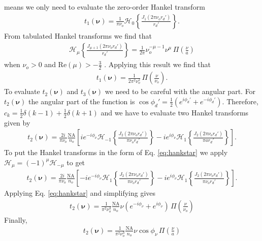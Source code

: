 \documentclass[11pt]{article}
\providecommand{\bs}[1]{\boldsymbol{#1}}
\begin{document}
means we only need to evaluate the zero-order Hankel transform
\begin{align}
  t_1(\bs{\nu}) = \frac{1}{\pi \nu_o}\mathcal{H}_0\left\{\frac{J_1(2\pi \nu_or_d')}{r_d'}\right\}.
\end{align}
From tabulated Hankel transforms we find that
\begin{align}
  \mathcal{H}_{\mu}\left\{\frac{J_{\mu+1}(2\pi \nu_or_d')}{r_d'}\right\} =
  \frac{1}{2\pi}\nu_o^{-\mu-1}\nu^\mu\, \Pi\left(\frac{\nu}{a}\right)\label{eq:hankstar}
\end{align}
when $\nu_o > 0$ and $\text{Re}(\mu) > -\frac{3}{2}$ \cite{poul1998}. Applying this result
we find that
\begin{align}
  t_1(\bs{\nu}) =
    \frac{1}{2\pi^2 \nu_o^{2}}\, \Pi\left(\frac{\nu}{\nu_o}\right)\label{eq:t1final}.
\end{align}
To evaluate $t_2(\bs{\nu})$ and $t_3(\bs{\nu})$ we need to be careful with the angular part. For $t_2(\bs{\nu})$
the angular part of the function is $\cos\phi_d' = \frac{1}{2}\left(e^{i\phi_d'} + e^{-i\phi_d'}\right)$. Therefore, $c_k = \frac{1}{2}\delta(k-1) + \frac{1}{2}\delta(k+1)$ and we have to evaluate two Hankel transforms given by
\begin{align}
  t_2(\bs{\nu}) = \frac{2i}{\pi \nu_o}\frac{\text{NA}}{n_o}\left[ie^{-i\phi_{\nu}}\mathcal{H}_{-1}\left\{\frac{J_2(2\pi \nu_or_d')}{\pi \nu_or_d'}\right\} - ie^{i\phi_{\nu}}\mathcal{H}_{1}\left\{\frac{J_2(2\pi \nu_or_d')}{\pi ar_d'}\right\}\right].
\end{align}
To put the Hankel transforms in the form of Eq. \ref{eq:hankstar} we apply
$\mathcal{H}_\mu = (-1)^\mu\mathcal{H}_{-\mu}$ to get
\begin{align}
  t_2(\bs{\nu}) = \frac{2i}{\pi \nu_o}\frac{\text{NA}}{n_o}\left[-ie^{-i\phi_{\nu}}\mathcal{H}_{1}\left\{\frac{J_2(2\pi \nu_or_d')}{\pi \nu_or_d'}\right\} - ie^{i\phi_{\nu}}\mathcal{H}_{1}\left\{\frac{J_2(2\pi \nu_or_d')}{\pi \nu_or_d'}\right\}\right].
\end{align}
Applying Eq. \ref{eq:hankstar} and simplifying gives
\begin{align}
  t_2(\bs{\nu}) =
    \frac{1}{\pi^2 \nu_o^3}\frac{\text{NA}}{n_o}\nu(e^{-i\phi_\nu} + e^{i\phi_\nu})\, \Pi\left(\frac{\nu}{\nu_o}\right)
\end{align}
Finally, 
\begin{align}
  t_2(\bs{\nu}) =
    \frac{1}{\pi^2 \nu_o^3}\frac{\text{NA}}{n_o}\nu\cos\phi_{\nu}\, \Pi\left(\frac{\nu}{a}\right)\label{eq:t2final}
\end{align}
\end{document}
